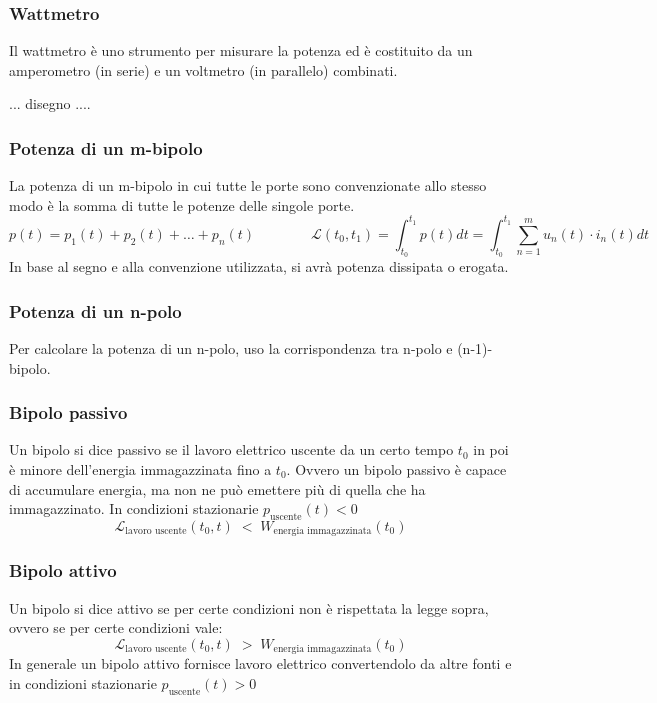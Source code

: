 \documentclass[a4paper]{article}
\begin{document}
\subsubsection*{Wattmetro}
Il wattmetro è uno strumento per misurare la potenza ed è costituito da un amperometro (in serie) e un voltmetro (in parallelo) combinati.
\begin{center}
	... disegno ....
\end{center}

\newpage

\subsubsection*{Potenza di un m-bipolo}
La potenza di un m-bipolo in cui tutte le porte sono convenzionate allo stesso modo è la somma di tutte le potenze delle singole porte.
\[p(t) = p_1(t) + p_2(t) + \dots + p_n(t) \qquad \qquad \mathcal{L}(t_0, t_1) = \int_{t_0}^{t_1} p(t) dt = \int_{t_0}^{t_1} \sum_{n=1}^{m} u_n(t) \cdot i_n(t) dt\]
In base al segno e alla convenzione utilizzata, si avrà potenza dissipata o erogata.

\subsubsection*{Potenza di un n-polo}
Per calcolare la potenza di un n-polo, uso la corrispondenza tra n-polo e (n-1)-bipolo.

\subsubsection*{Bipolo passivo}
Un bipolo si dice passivo se il lavoro elettrico uscente da un certo tempo \(t_0\) in poi è minore dell'energia immagazzinata
fino a \(t_0\). Ovvero un bipolo passivo è capace di accumulare energia, ma non ne può emettere più di quella che ha immagazzinato.
In condizioni stazionarie \(p_\text{uscente}(t) < 0\)
\[\mathcal{L}_\text{lavoro uscente}(t_0,t) \; < \; W_\text{energia immagazzinata}(t_0)\]

\subsubsection*{Bipolo attivo}
Un bipolo si dice attivo se per certe condizioni non è rispettata la legge sopra, ovvero se per certe condizioni vale:
\[\mathcal{L}_\text{lavoro uscente}(t_0,t) \; > \; W_\text{energia immagazzinata}(t_0)\]
In generale un bipolo attivo fornisce lavoro elettrico convertendolo da altre fonti e in condizioni stazionarie \(p_\text{uscente}(t) > 0\)
\end{document}

